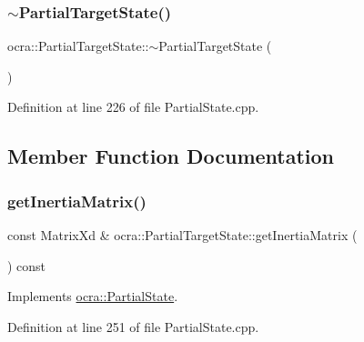 \subsubsection{\texorpdfstring{$\sim$\+Partial\+Target\+State()}{~PartialTargetState()}}
{\footnotesize\ttfamily ocra\+::\+Partial\+Target\+State\+::$\sim$\+Partial\+Target\+State (\begin{DoxyParamCaption}{ }\end{DoxyParamCaption})\hspace{0.3cm}{\ttfamily [virtual]}}



Definition at line 226 of file Partial\+State.\+cpp.



\subsection{Member Function Documentation}
\hypertarget{classocra_1_1PartialTargetState_a757cd49fca47e934025e92b81dc15535}{}\label{classocra_1_1PartialTargetState_a757cd49fca47e934025e92b81dc15535} 
\subsubsection{\texorpdfstring{get\+Inertia\+Matrix()}{getInertiaMatrix()}}
{\footnotesize\ttfamily const Matrix\+Xd \& ocra\+::\+Partial\+Target\+State\+::get\+Inertia\+Matrix (\begin{DoxyParamCaption}{ }\end{DoxyParamCaption}) const\hspace{0.3cm}{\ttfamily [virtual]}}



Implements \hyperlink{classocra_1_1PartialState_ad811a25932f0fad439242ebd48841162}{ocra\+::\+Partial\+State}.



Definition at line 251 of file Partial\+State.\+cpp.

\hypertarget{classocra_1_1PartialTargetState_a0e6f90f112e0a54384eb99dd7def49e0}{}\label{classocra_1_1PartialTargetState_a0e6f90f112e0a54384eb99dd7def49e0} 
